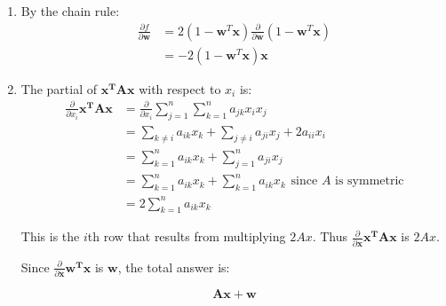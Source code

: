 \documentclass{harvardml}
\theoremstyle{definition}
\theoremstyle{plain}
\begin{document}
\begin{problem}
\begin{enumerate} [label=(\alph*)]
		        \item By the chain rule: \begin{align*}
		            \frac{\partial f}{\partial \mathbf{w}} &= 2(1-\mathbf{w}^T\mathbf{x}) \frac{\partial}{\partial \mathbf{w}} (1-\mathbf{w}^T\mathbf{x}) \\
		            &= -2(1-\mathbf{w}^T\mathbf{x})\mathbf{x}
		        \end{align*}
		        
		        \item The partial of $\mathbf{x^TAx}$ with respect to $x_i$ is: \begin{align*}
		            \frac{\partial}{\partial x_i} \mathbf{x^TAx} &= \frac{\partial}{\partial x_i} \sum_{j=1}^n \sum_{k=1}^n a_{jk} x_i x_j \\
		            &= \sum_{k\neq i}a_{ik} x_k +  \sum_{j\neq i}a_{ji}x_j + 2a_{ii}x_i \\ 
		            &= \sum_{k=1}^n a_{ik} x_k + \sum_{j=1}^n a_{ji} x_j \\
		            &= \sum_{k=1}^n a_{ik} x_k + \sum_{k=1}^n a_{ik} x_k \hspace{5pt} \text{since $A$ is symmetric}\\
		            &= 2\sum_{k=1}^n a_{ik} x_k
		        \end{align*}
		        
		        This is the $i$th row that results from multiplying $2Ax$. Thus $\frac{\partial}{\partial \mathbf{x}} \mathbf{x^TAx}$ is $2Ax$.
		        
		        Since $\frac{\partial}{\partial \mathbf{x}}\mathbf{w^Tx}$ is $\mathbf{w}$, the total answer is:
		        
		        \begin{equation}
		            \mathbf{A}\mathbf{x} + \mathbf{w}
		        \end{equation}
		       
		    \end{enumerate}
 		    
		\end{problem}
        
\end{document}
